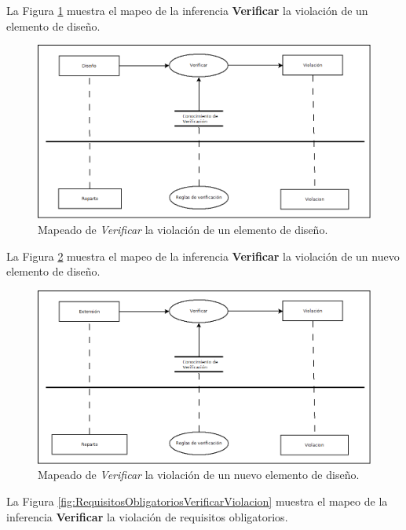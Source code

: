 La Figura \ref{fig:DisenoVerificarViolacion} muestra el mapeo de la inferencia \textbf{Verificar} la violación de un elemento de diseño.

\begin{figure}[H]
  \centering
  \includegraphics[scale=0.35]{imaxes/DisenoVerificarViolacion.png}
  \caption{\label{fig:DisenoVerificarViolacion}Mapeado de \textit{Verificar} la violación de un elemento de diseño.}
\end{figure}

La Figura \ref{fig:ExtensionVerificarViolacion} muestra el mapeo de la inferencia \textbf{Verificar} la violación de un nuevo elemento de diseño.

\begin{figure}[H]
  \centering
  \includegraphics[scale=0.35]{imaxes/ExtensionVerificarViolacion.png}
  \caption{\label{fig:ExtensionVerificarViolacion}Mapeado de \textit{Verificar} la violación de un nuevo elemento de diseño.}
\end{figure}

La Figura \ref{fig:RequisitosObligatoriosVerificarViolacion} muestra el mapeo de la inferencia \textbf{Verificar} la violación de requisitos obligatorios.

